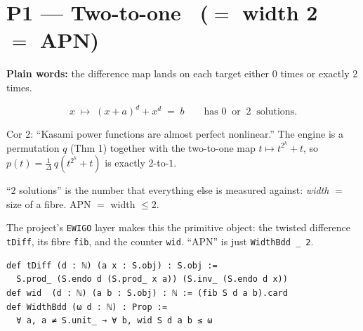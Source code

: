 \documentclass[11pt]{article}
\begin{document}
\section{P1 --- Two-to-one \ ($=$ width 2 \ $=$ APN)}

\textbf{Plain words:} the difference map lands on each target either $0$ times or exactly $2$ times.

\[
  x \;\longmapsto\; (x+a)^d + x^d \;=\; b
  \qquad\text{has \ }0\ \text{ or }\ 2\ \text{ solutions.}
\]

\begin{center}
\end{center}

\begin{remarkbox}
Cor 2: ``Kasami power functions are almost perfect nonlinear.'' The engine is a
permutation $q$ (Thm 1) together with the two-to-one map $t\mapsto t^{2^k}+t$,
so $p(t)=\tfrac{1}{\Delta}\,q(t^{2^k}+t)$ is exactly $2$-to-$1$.
\end{remarkbox}

\begin{coolfact}
``$2$ solutions'' is the number that everything else is measured against:
\emph{width} $=$ size of a fibre. APN $=$ width $\le 2$.
\end{coolfact}

\begin{leanbox}
The project's \texttt{EWIGO} layer makes this the primitive object: the twisted
difference \texttt{tDiff}, its fibre \texttt{fib}, and the counter \texttt{wid}.
``APN'' is just \texttt{WidthBdd \_ 2}.
\begin{lstlisting}
def tDiff (d : ℕ) (a x : S.obj) : S.obj :=
  S.prod_ (S.endo d (S.prod_ x a)) (S.inv_ (S.endo d x))
def wid  (d : ℕ) (a b : S.obj) : ℕ := (fib S d a b).card
def WidthBdd (ω d : ℕ) : Prop :=
  ∀ a, a ≠ S.unit_ → ∀ b, wid S d a b ≤ ω
\end{lstlisting}
\end{leanbox}
\end{document}
